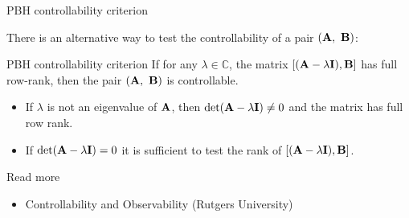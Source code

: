 \documentclass{beamer}
\begin{document}
\begin{frame}{PBH controllability criterion}
	\begin{flushleft}
		
		There is an alternative way to test the controllability of a pair $(\mathbf{A}, \ \mathbf{B})$:
		
		\begin{block}{PBH controllability criterion}
			If for any $\lambda \in \mathbb{C}$, the matrix $[ (\mathbf{A}-\lambda\mathbf{I}), \mathbf{B}]$ has full row-rank, then the pair $(\mathbf{A}, \ \mathbf{B})$ is controllable.
		\end{block}
		
		\begin{itemize}
			\item If $\lambda$ is not an eigenvalue of $\mathbf{A}$, then $\text{det}(\mathbf{A}-\lambda\mathbf{I}) \neq 0$ and the matrix has full row rank.
			
			\item If $\text{det}(\mathbf{A}-\lambda\mathbf{I}) = 0$ it is sufficient to test the rank of $[ (\mathbf{A}-\lambda\mathbf{I}), \mathbf{B}]$.
			
			
		\end{itemize}
		
	\end{flushleft}
\end{frame}




\begin{frame}{Read more}
	
	\begin{itemize}
		
		\item Controllability and Observability (Rutgers University) 
		
	\end{itemize}
	
\end{frame}

\myqrframe
\end{document}
